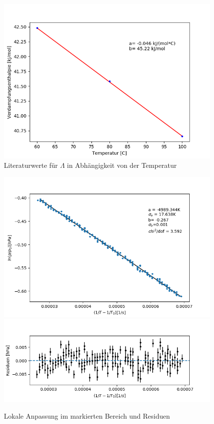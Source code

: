 \documentclass[12pt,a4paper]{article}
\begin{document}
\begin{figure}
\includegraphics[width=\linewidth]{Bilder/Lambda_Literaturwert_fit.png}
\caption[Literaturwerte für $\Lambda$ in Abhängigkeit von der Temperatur]{Literaturwerte für $\Lambda$ in Abhängigkeit von der Temperatur}
\label{fig:LiteraturwertLambda}
\end{figure}

\begin{figure}
\includegraphics[width=\linewidth]{Bilder/lokaler_fit_2A.png}
\includegraphics[width=\linewidth]{Bilder/lokale_Residuen_2A}
\caption[Lokale Anpassung]{Lokale Anpassung im markierten Bereich und Residuen}
\label{fig:fit_2A}
\end{figure}
\end{document}
